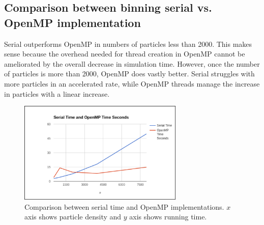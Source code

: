 \documentclass{article}
\begin{document}
\subsection{Comparison between binning serial vs. OpenMP implementation}
Serial outperforms OpenMP in numbers of particles less than 2000. This makes
sense because the overhead needed for thread creation in OpenMP cannot be
ameliorated by the overall decrease in simulation time. However, once the number
of particles is more than 2000, OpenMP does vastly better. Serial struggles with
more particles in an accelerated rate, while OpenMP threads manage the increase
in particles with a linear increase.
\begin{figure}[h]
\centering
\includegraphics[width=0.7\textwidth]{Picture3.png}
\caption{Comparison between serial time and OpenMP implementations. $x$ axis
shows particle density and $y$ axis shows running time.}
\end{figure}
\clearpage


\end{document}

